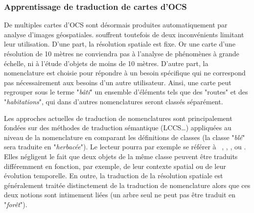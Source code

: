 \subsubsection*{Apprentissage de traduction de cartes d'OCS}
De multiples cartes d'OCS sont désormais produites automatiquement par analyse d'images géospatiales. souffrent toutefois de deux inconvénients limitant leur utilisation. D'une part, la résolution spatiale est fixe. Or une carte d'une résolution de 10 mètres ne conviendra pas à l'analyse de phénomènes à grande échelle, ni à l'étude d'objets de moins de 10 mètres. D'autre part, la nomenclature est choisie pour répondre à un besoin spécifique qui ne correspond pas nécessairement aux besoins d'un autre utilisateur. Ainsi, une carte peut regrouper sous le terme "\emph{bâti}" un ensemble d'éléments tels que des "rout\emph{}es" et des "\emph{habitations}", qui dans d'autres nomenclatures seront classés séparément.
       
Les approches actuelles de traduction de nomenclatures sont principalement fondées sur des méthodes de traduction sémantique (LCCS\ldots) appliquées au niveau de la nomenclature en comparant les définitions de classes (la classe "\emph{blé}" sera traduite en "\emph{herbacée}"). Le lecteur pourra par exemple se référer à ~\cite{DiGregorio1998}, \cite{Jepsen2013}, \cite{Adamo2014}, ou \cite{Li2020}. Elles négligent le fait que deux objets de la même classe peuvent être traduits différemment en fonction, par exemple, de leur contexte spatial ou de leur évolution temporelle. En outre, la traduction de la résolution spatiale est généralement traitée distinctement de la traduction de nomenclature alors que ces deux notions sont intimement liées (un arbre seul ne peut pas être traduit en "\emph{forêt}").
       
